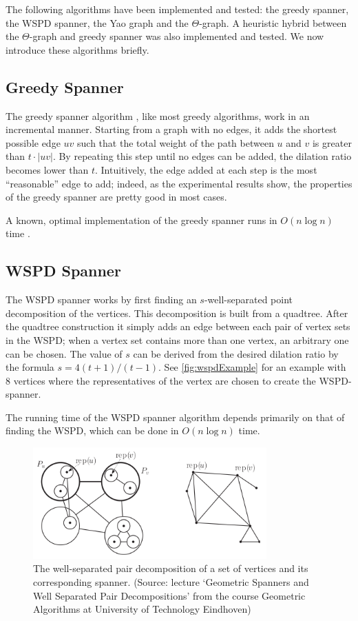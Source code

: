 \documentclass[a4paper,twoside,11pt,hidelinks]{article}
\theoremstyle{plain}
\theoremstyle{definition}  %
\begin{document}
The following algorithms have been implemented and tested: the greedy spanner, the WSPD spanner, the Yao graph and the $\Theta$-graph. A heuristic hybrid between the $\Theta$-graph and greedy spanner was also implemented and tested. We now introduce these algorithms briefly.

\subsection{Greedy Spanner}

The greedy spanner algorithm \cite{althofer1993sparse}, like most greedy algorithms, work in an incremental manner. Starting from a graph with no edges, it adds the shortest possible edge $uv$ such that the total weight of the path between $u$ and $v$ is greater than $t\cdot|uv|$. By repeating this step until no edges can be added, the dilation ratio becomes lower than $t$. Intuitively, the edge added at each step is the most ``reasonable'' edge to add; indeed, as the experimental results show, the properties of the greedy spanner are pretty good in most cases.

A known, optimal implementation of the greedy spanner runs in $O(n \log n)$ time \cite{gudmundsson2000improved}.

\subsection{WSPD Spanner}

The WSPD spanner \cite{callahan1995decomposition} works by first finding an $s$-well-separated point decomposition of the vertices. This decomposition is built from a quadtree. After the quadtree construction it simply adds an edge between each pair of vertex sets in the WSPD; when a vertex set contains more than one vertex, an arbitrary one can be chosen. The value of $s$ can be derived from the desired dilation ratio by the formula $s = 4(t+1) / (t-1)$. See \autoref{fig:wspdExample} for an example with 8 vertices where the representatives of the vertex are chosen to create the WSPD-spanner.

The running time of the WSPD spanner algorithm depends primarily on that of finding the WSPD, which can be done in $O(n \log n)$ time.

\begin{figure}[h]
    \centering
    \includegraphics[width=0.8\textwidth]{figures/wspd.png}
    \caption{The well-separated pair decomposition of a set of vertices and its corresponding spanner. (Source: lecture `Geometric Spanners and Well Separated Pair Decompositions' from the course Geometric Algorithms at University of Technology Eindhoven)}
    \label{fig:wspdExample}
\end{figure}
\end{document}
